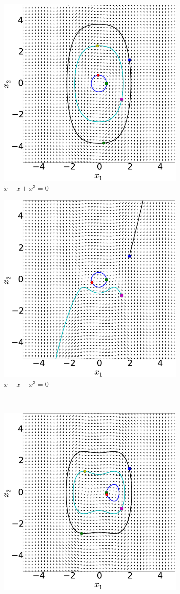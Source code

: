 \documentclass[12pt, a4paper]{extreport}
\begin{document}
%
\begin{figure}[H]
    \centering
    \begin{subfigure}[t]{7 cm}
        \centering
        \includegraphics[height=7 cm]{figure/2A.eps}
        \caption{$\ddot{x} + x + x^3 = 0$}
    \end{subfigure}
    \quad
    \begin{subfigure}[t]{7 cm}
        \centering
        \includegraphics[height=7 cm]{figure/2B.eps}
        \caption{$\ddot{x} + x - x^3 = 0$}
    \end{subfigure}
    \\
    \begin{subfigure}[t]{7 cm}
        \centering
        \includegraphics[height=7 cm]{figure/2C.eps}

\end{subfigure}
\end{figure}
\end{document}

